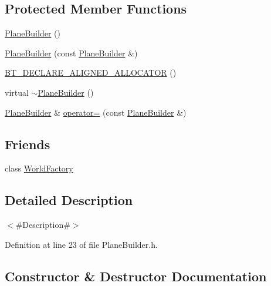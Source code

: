\subsection*{Protected Member Functions}
\begin{DoxyCompactItemize}
\item 
\mbox{\hyperlink{classnjli_1_1_plane_builder_aa5d5ef367ad8b77b3f7d900450633fa7}{Plane\+Builder}} ()
\item 
\mbox{\hyperlink{classnjli_1_1_plane_builder_a6a0c6795347d5cbecf83701b0954f8c3}{Plane\+Builder}} (const \mbox{\hyperlink{classnjli_1_1_plane_builder}{Plane\+Builder}} \&)
\item 
\mbox{\hyperlink{classnjli_1_1_plane_builder_aa03f4e80efac67513aa91dda3a7a4e25}{B\+T\+\_\+\+D\+E\+C\+L\+A\+R\+E\+\_\+\+A\+L\+I\+G\+N\+E\+D\+\_\+\+A\+L\+L\+O\+C\+A\+T\+OR}} ()
\item 
virtual \mbox{\hyperlink{classnjli_1_1_plane_builder_a553e71e7b6b410868df41c384aabc44d}{$\sim$\+Plane\+Builder}} ()
\item 
\mbox{\hyperlink{classnjli_1_1_plane_builder}{Plane\+Builder}} \& \mbox{\hyperlink{classnjli_1_1_plane_builder_afd2a66270153479a9fab0ff1be6052ab}{operator=}} (const \mbox{\hyperlink{classnjli_1_1_plane_builder}{Plane\+Builder}} \&)
\end{DoxyCompactItemize}
\subsection*{Friends}
\begin{DoxyCompactItemize}
\item 
class \mbox{\hyperlink{classnjli_1_1_plane_builder_acb96ebb09abe8f2a37a915a842babfac}{World\+Factory}}
\end{DoxyCompactItemize}


\subsection{Detailed Description}
$<$\#\+Description\#$>$ 

Definition at line 23 of file Plane\+Builder.\+h.



\subsection{Constructor \& Destructor Documentation}
\mbox{\label{classnjli_1_1_plane_builder_aa5d5ef367ad8b77b3f7d900450633fa7}} 

